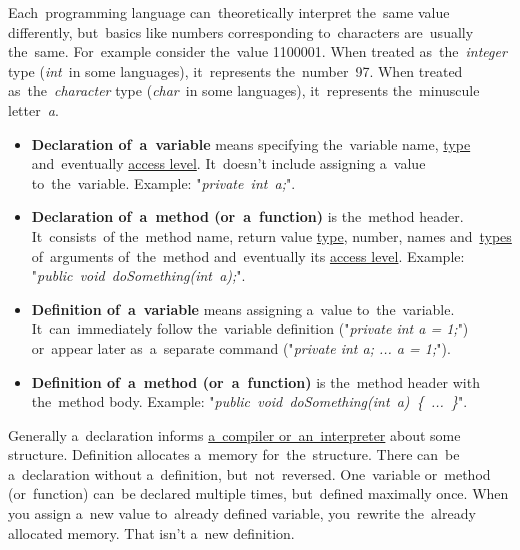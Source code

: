 Each~programming language can~theoretically interpret the~same value differently, but~basics like numbers corresponding to~characters are~usually the~same. For~example consider the~value 1100001. When treated as~the~\textit{integer} type (\textit{int}~in some languages), it~represents the~number~97. When treated as~the~\textit{character} type (\textit{char}~in some languages), it~represents the~minuscule letter~\textit{a}.

\label{declarationdefinition}
\begin{itemize}
    \item \textbf{Declaration of~a~variable} means specifying the~variable name, \hyperref[datatypes]{type} and~eventually \hyperref[accessmodifiers]{access level}. It~doesn't include assigning a~value to~the~variable. Example: "\textit{\mbox{private int a;}}".
    \item \textbf{Declaration of~a~method (or~a~function)} is the~method header. It~consists~of the~method name, return value \hyperref[datatypes]{type}, number, names and~\hyperref[datatypes]{types} of~arguments of~the~method and~eventually its \hyperref[accessmodifiers]{access level}. Example: "\textit{\mbox{public void doSomething(int a);}}".
    \item \textbf{Definition of~a~variable} means assigning a~value to~the~variable. It~can~immediately follow the~variable definition ("\textit{private int a = 1;}") or~appear later as~a~separate command ("\textit{private int a; ... a = 1;}").
    \item \textbf{Definition of~a~method (or~a~function)} is the~method header with the~method body. Example: "\textit{\mbox{public void doSomething(int a) \{ ... \}}}".
\end{itemize}
\noindent Generally a~declaration informs \hyperref[compiledinterpretedlanguages]{a~compiler or~an~interpreter} about some structure. Definition allocates a~memory for~the~structure. There can~be a~declaration without a~definition, but~not~reversed. One~variable or~method (or~function) can~be declared multiple times, but~defined maximally once. When you assign a~new value to~already defined variable, you~rewrite the~already allocated memory. That isn't a~new definition.


